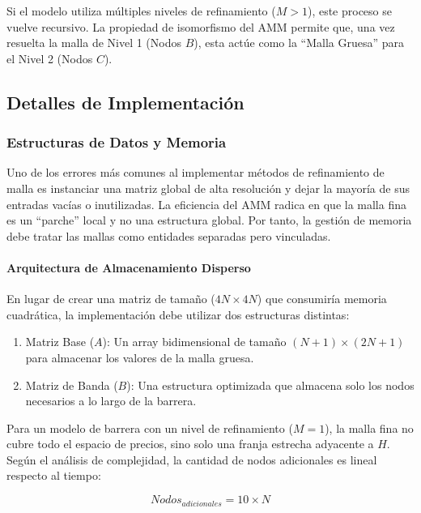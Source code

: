 Si el modelo utiliza múltiples niveles de refinamiento ($M>1$), este proceso se vuelve recursivo. La propiedad de isomorfismo del AMM permite que, una vez resuelta la malla de Nivel 1 (Nodos $B$), esta actúe como la ``Malla Gruesa'' para el Nivel 2 (Nodos $C$).

\subsection{Detalles de Implementación}
\label{sec:detalles_impl_arboles}

\subsubsection{Estructuras de Datos y Memoria}
\label{sec:data_structures}

Uno de los errores más comunes al implementar métodos de refinamiento de malla es instanciar una matriz global de alta resolución y dejar la mayoría de sus entradas vacías o inutilizadas. La eficiencia del AMM radica en que la malla fina es un ``parche'' local y no una estructura global. Por tanto, la gestión de memoria debe tratar las mallas como entidades separadas pero vinculadas.

\paragraph{Arquitectura de Almacenamiento Disperso} 

En lugar de crear una matriz de tamaño ($4N\times 4N$) que consumiría memoria cuadrática, la implementación debe utilizar dos estructuras distintas:

\begin{enumerate} 
  \item Matriz Base ($A$): Un array bidimensional de tamaño $(N+1)\times(2N+1)$ para almacenar los valores de la malla gruesa.
  
  \item Matriz de Banda ($B$): Una estructura optimizada que almacena solo los nodos necesarios a lo largo de la barrera.
\end{enumerate}

Para un modelo de barrera con un nivel de refinamiento ($M=1$), la malla fina no cubre todo el espacio de precios, sino solo una franja estrecha adyacente a $H$. Según el análisis de complejidad, la cantidad de nodos adicionales es lineal respecto al tiempo: 

\begin{equation} 
  Nodos_{adicionales} = 10 \times N 
\end{equation} 

